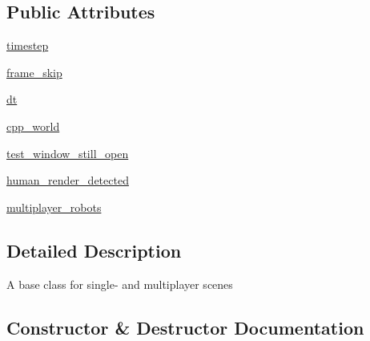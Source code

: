 \subsection*{Public Attributes}
\begin{DoxyCompactItemize}
\item 
\hyperlink{classpybullet-gym_1_1pybulletgym_1_1envs_1_1mujoco_1_1scenes_1_1scene__bases_1_1_scene_a29de076e83c72d0aafa872cd87253525}{timestep}
\item 
\hyperlink{classpybullet-gym_1_1pybulletgym_1_1envs_1_1mujoco_1_1scenes_1_1scene__bases_1_1_scene_ab01bd569d377a9da9fa4232dc63ddadf}{frame\+\_\+skip}
\item 
\hyperlink{classpybullet-gym_1_1pybulletgym_1_1envs_1_1mujoco_1_1scenes_1_1scene__bases_1_1_scene_a73c12802bd6d4f4494be56f5c860e977}{dt}
\item 
\hyperlink{classpybullet-gym_1_1pybulletgym_1_1envs_1_1mujoco_1_1scenes_1_1scene__bases_1_1_scene_a638c3fd7ce8ec463bb1bd018ed0f2337}{cpp\+\_\+world}
\item 
\hyperlink{classpybullet-gym_1_1pybulletgym_1_1envs_1_1mujoco_1_1scenes_1_1scene__bases_1_1_scene_a468baab9f47e92103bf34f1b86798996}{test\+\_\+window\+\_\+still\+\_\+open}
\item 
\hyperlink{classpybullet-gym_1_1pybulletgym_1_1envs_1_1mujoco_1_1scenes_1_1scene__bases_1_1_scene_a264303652ec6140ae4c1bbcb1ec22b6c}{human\+\_\+render\+\_\+detected}
\item 
\hyperlink{classpybullet-gym_1_1pybulletgym_1_1envs_1_1mujoco_1_1scenes_1_1scene__bases_1_1_scene_aae3348d1f85d350cec50b2c6550b10ad}{multiplayer\+\_\+robots}
\end{DoxyCompactItemize}


\subsection{Detailed Description}
\begin{DoxyVerb}A base class for single- and multiplayer scenes\end{DoxyVerb}
 

\subsection{Constructor \& Destructor Documentation}
